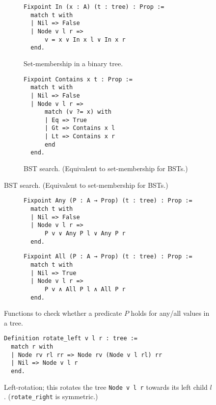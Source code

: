 \documentclass[acmsmall, authorversion, nonacm, overload]{acmart}
\begin{document}
\begin{figure}[h!]
  \begin{subfigure}{0.5\textwidth}
    \centering
\begin{verbatim}
Fixpoint In (x : A) (t : tree) : Prop :=
  match t with
  | Nil => False
  | Node v l r =>
      v = x ∨ In x l ∨ In x r
  end.
\end{verbatim}
  \caption*{Set-membership in a binary tree.}
  \end{subfigure}%
  \begin{subfigure}{0.5\textwidth}
  \begin{verbatim}
Fixpoint Contains x t : Prop :=
  match t with
  | Nil => False
  | Node v l r =>
      match (v ?= x) with
      | Eq => True
      | Gt => Contains x l
      | Lt => Contains x r
      end
  end.
\end{verbatim}
  \caption*{BST search. (Equivalent to set-membership for BSTs.)}
  \end{subfigure}
\end{figure}

\begin{figure}[h!]
  \begin{subfigure}{0.5\textwidth}
    \centering
\begin{verbatim}
Fixpoint Any (P : A → Prop) (t : tree) : Prop :=
  match t with
  | Nil => False
  | Node v l r =>
      P v ∨ Any P l ∨ Any P r
  end.
\end{verbatim}
  \end{subfigure}%
  \begin{subfigure}{0.5\textwidth}
  \begin{verbatim}
Fixpoint All (P : A → Prop) (t : tree) : Prop :=
  match t with
  | Nil => True
  | Node v l r =>
      P v ∧ All P l ∧ All P r
  end.
\end{verbatim}
  \end{subfigure}
  \caption*{Functions to check whether a predicate $P$ holds for any/all values in a tree.}
\end{figure}

\begin{figure}[h!]
\begin{verbatim}
Definition rotate_left v l r : tree :=
  match r with
  | Node rv rl rr => Node rv (Node v l rl) rr
  | Nil => Node v l r
  end.
\end{verbatim}
  \caption*{Left-rotation; this rotates the tree \texttt{Node v l r} towards its left child $l$.
    (\texttt{rotate_right} is symmetric.)}
\end{figure}
\end{document}

